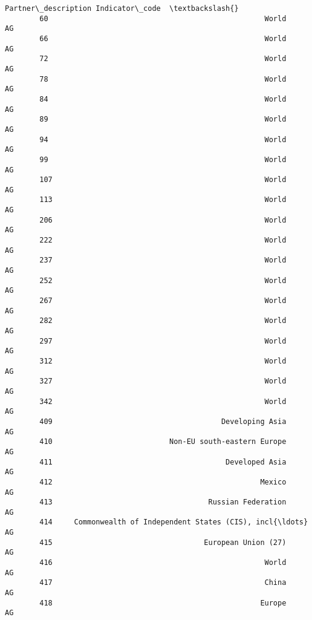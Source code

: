 \documentclass[11pt]{article}
\begin{document}
\begin{Verbatim}[commandchars=\\\{\}]
                                              Partner\_description Indicator\_code  \textbackslash{}
        60                                                  World       AG         
        66                                                  World       AG         
        72                                                  World       AG         
        78                                                  World       AG         
        84                                                  World       AG         
        89                                                  World       AG         
        94                                                  World       AG         
        99                                                  World       AG         
        107                                                 World       AG         
        113                                                 World       AG         
        206                                                 World       AG         
        222                                                 World       AG         
        237                                                 World       AG         
        252                                                 World       AG         
        267                                                 World       AG         
        282                                                 World       AG         
        297                                                 World       AG         
        312                                                 World       AG         
        327                                                 World       AG         
        342                                                 World       AG         
        409                                       Developing Asia       AG         
        410                           Non-EU south-eastern Europe       AG         
        411                                        Developed Asia       AG         
        412                                                Mexico       AG         
        413                                    Russian Federation       AG         
        414     Commonwealth of Independent States (CIS), incl{\ldots}       AG         
        415                                   European Union (27)       AG         
        416                                                 World       AG         
        417                                                 China       AG         
        418                                                Europe       AG         

\end{Verbatim}
\end{document}
